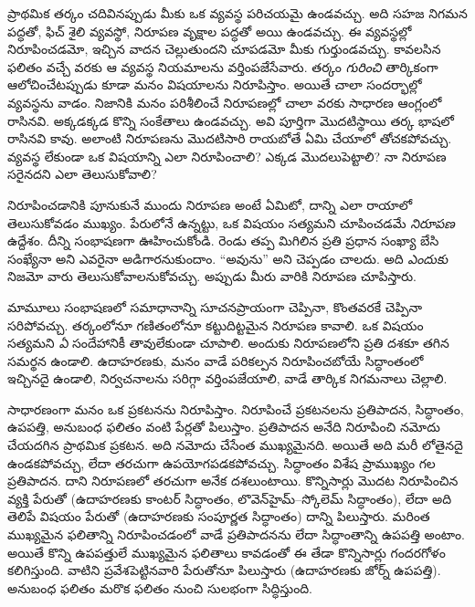 \documentclass[../../../include/open-logic-section]{subfiles}
\begin{document}


ప్రాథమిక తర్కం చదివినప్పుడు మీకు ఒక 
వ్యవస్థ పరిచయమై ఉండవచ్చు. అది సహజ నిగమన పద్ధతో, ఫిచ్ శైలి
 వ్యవస్థో, నిరూపణ వృక్షాల పద్ధతో
అయి ఉండవచ్చు. ఈ వ్యవస్థల్లో 
నిరూపించడమో, ఇచ్చిన వాదన చెల్లుతుందని చూపడమో మీకు గుర్తుండవచ్చు.
కావలసిన ఫలితం వచ్చే వరకు ఆ వ్యవస్థ నియమాలను వర్తింపజేసేవారు.
తర్కం \emph{గురించి} తార్కికంగా ఆలోచించేటప్పుడు కూడా మనం విషయాలను నిరూపిస్తాం.
అయితే చాలా సందర్భాల్లో  వ్యవస్థను
వాడం. నిజానికి మనం పరిశీలించే నిరూపణల్లో చాలా వరకు సాధారణ
ఆంగ్లంలో రాసినవి. అక్కడక్కడ కొన్ని సంకేతాలు ఉండవచ్చు. అవి పూర్తిగా
మొదటిస్థాయి తర్క భాషలో రాసినవి కావు. అలాంటి నిరూపణను మొదటిసారి
రాయబోతే ఏమి చేయాలో తోచకపోవచ్చు. 
వ్యవస్థ లేకుండా ఒక విషయాన్ని ఎలా నిరూపించాలి? ఎక్కడ మొదలుపెట్టాలి?
నా నిరూపణ సరైనదని ఎలా తెలుసుకోవాలి?

నిరూపించడానికి పూనుకునే ముందు నిరూపణ అంటే ఏమిటో, దాన్ని ఎలా
రాయాలో తెలుసుకోవడం ముఖ్యం. పేరులోనే ఉన్నట్టు, ఒక విషయం సత్యమని
చూపించడమే \emph{నిరూపణ} ఉద్దేశం. దీన్ని సంభాషణగా ఊహించుకోండి.
రెండు తప్ప మిగిలిన ప్రతి ప్రధాన సంఖ్యా బేసి సంఖ్యేనా అని ఎవరైనా
అడిగారనుకుందాం. ``అవును'' అని చెప్పడం చాలదు. అది \emph{ఎందుకు}
నిజమో వారు తెలుసుకోవాలనుకోవచ్చు. అప్పుడు మీరు వారికి నిరూపణ చూపిస్తారు.

మామూలు సంభాషణలో సమాధానాన్ని సూచనప్రాయంగా చెప్పినా, కొంతవరకే
చెప్పినా సరిపోవచ్చు. తర్కంలోనూ గణితంలోనూ కట్టుదిట్టమైన నిరూపణ
కావాలి. ఒక విషయం సత్యమని \emph{ఏ} సందేహానికీ తావులేకుండా చూపాలి.
అందుకు నిరూపణలోని ప్రతి దశకూ తగిన సమర్థన ఉండాలి. ఉదాహరణకు,
మనం వాడే పరికల్పన నిరూపించబోయే సిద్ధాంతంలో ఇచ్చినదై ఉండాలి,
నిర్వచనాలను సరిగ్గా వర్తింపజేయాలి, వాడే తార్కిక నిగమనాలు చెల్లాలి.

సాధారణంగా మనం ఒక ప్రకటనను నిరూపిస్తాం. నిరూపించే ప్రకటనలను ప్రతిపాదన, సిద్ధాంతం, ఉపపత్తి, అనుబంధ
ఫలితం వంటి పేర్లతో పిలుస్తాం. ప్రతిపాదన అనేది నిరూపించి నమోదు
చేయదగిన ప్రాథమిక ప్రకటన. అది నమోదు చేసేంత ముఖ్యమైనది. అయితే
అది మరీ లోతైనదై ఉండకపోవచ్చు, లేదా తరచుగా ఉపయోగపడకపోవచ్చు.
సిద్ధాంతం విశేష ప్రాముఖ్యం గల ప్రతిపాదన. దాని నిరూపణలో తరచుగా
అనేక దశలుంటాయి. కొన్నిసార్లు మొదట నిరూపించిన వ్యక్తి పేరుతో
(ఉదాహరణకు కాంటర్ సిద్ధాంతం, లొవెన్‌హైమ్--స్కోలెమ్ సిద్ధాంతం),
లేదా అది తెలిపే విషయం పేరుతో (ఉదాహరణకు సంపూర్ణత సిద్ధాంతం)
దాన్ని పిలుస్తారు. మరింత ముఖ్యమైన ఫలితాన్ని నిరూపించడంలో వాడే
ప్రతిపాదనను లేదా సిద్ధాంతాన్ని ఉపపత్తి అంటాం. అయితే కొన్ని
ఉపపత్తులే ముఖ్యమైన ఫలితాలు కావడంతో ఈ తేడా కొన్నిసార్లు
గందరగోళం కలిగిస్తుంది. వాటిని ప్రవేశపెట్టినవారి పేరుతోనూ పిలుస్తారు
(ఉదాహరణకు జోర్న్ ఉపపత్తి). అనుబంధ ఫలితం మరొక ఫలితం నుంచి
సులభంగా సిద్ధిస్తుంది.
\end{document}
